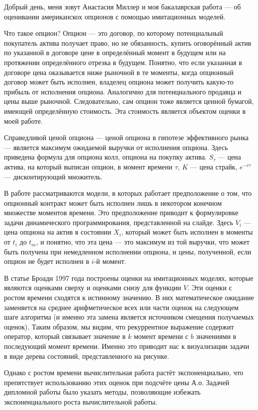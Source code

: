 \documentclass{article}
\begin{document}
Добрый день, меня зовут Анастасия Миллер и моя бакалаврская работа --- об оценивании американскох опционов с помощью имитационных моделей.

Что такое опцион? Опцион --- это договор, по которому потенциальный покупатель актива получает право, но не обязанность, купить оговорённый актив по указанной в договоре цене в определённый момент в будущем или на протяжении определённого отрезка в будущем. Понятно, что если указанная в договоре цена оказывается ниже рыночной в те моменты, когда опционный договор может быть исполнен, владелец опциона может получить какую-то прибыль от исполнения опциона. Аналогично для потенциального продавца и цены выше рыночной. Следовательно, сам опцион тоже является ценной бумагой, имеющей определённую стоимость. Эта стоимость является объектом оценки в моей работе.

Справедливой ценой опциона --- ценой опциона в гипотезе эффективного рынка --- является максимум ожидаемой выручки от исполнения опциона. Здесь приведена формула для опциона колл, опциона на покупку актива. $S_\tau$ --- цена актива, на который выписан опцион, в момент времени $\tau$, $K$ --- цена страйк, $e^{-r\tau}$ --- дисконтирующий множитель.

В работе рассматриваются модели, в которых работает предположение о том, что опционный контракт может быть исполнен лишь в некотором конечном множестве моментов времени. Это предположение приводит к формулировке задачи динамического программирования, представленной на слайде. Здесь $V_i$ --- цена опциона на актив в состоянии $X_i$, который может быть исполнен в моменты от $t_i$ до $t_m$, и понятно, что эта цена --- это максимум из той выручки, что может быть получена при немедленном исполнении опциона, и цены, полученной, если опцион не будет исполнен в $i$-й момент.

В статье Броади 1997 года построены оценки на имитационных моделях, которые являются оценками сверху и оценками снизу для функции $V$. Эти оценки с ростом времени сходятся к истинному значению. В них математическое ожидание заменяется на среднее арифметическое всех или части оценок на следующем шаге алгоритма (и именно эта замена является источником смещения получаемых оценок). Таким образом, мы видим, что рекуррентное выражение содержит оператор, который связывает значение в $k$ момент времени с $b$ значениями в последующий момент времени. Именно это приводит нас к визуализации задачи в виде дерева состояний, представленного на рисунке.

Однако с ростом времени вычислительная работа растёт экспоненциально, что препятствует использованию этих оценок при подсчёте цены А.о. Задачей дипломной работы было указать методы, позволяющие избежать экспоненциального роста вычислительной работы. 
\end{document}
